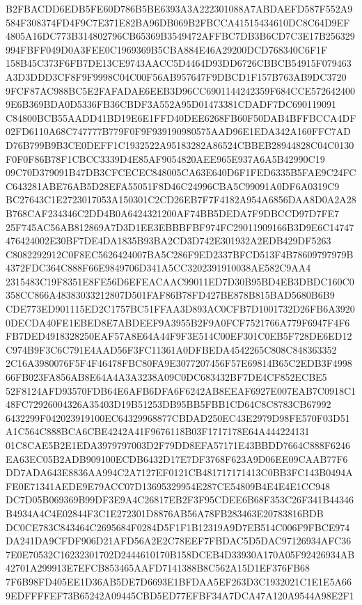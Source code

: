 \documentclass[UTF8,fontset=fandol,zihao=-4,a4paper]{ctexart}
\begin{document}
{{B2FBACDD6EDB5FE60D786B5BE6393A3A222301088A7ABDAEFD587F552A9584F308374FD4F9C7E371E82BA96DB069B2FBCCA41515434610DC8C64D9EF
4805A16DC773B314802796CB65369B3549472AFFBC7DB3B6CD7C3E17B256329994FBFF049D0A3FEE0C1969369B5CBA884E46A29200DCD768340C6F1F
158B45C373F6FB7DE13CE9743AACC5D4464D93DD6726CBBCB54915F079463A3D3DDD3CF8F9F9998C04C00F56AB957647F9DBCD1F157B763AB9DC3720
9FCF87AC988BC5E2FAFADAE6EEB3D96CC6901144242359F684CCE5726424009E6B369BDA0D5336FB36CBDF3A552A95D01473381CDADF7DC690119091
C84800BCB55AADD41BD19E6E1FFD40DEE6268FB60F50DAB4BFFBCCA4DF02FD6110A68C747777B779F0F9F939190980575AAD96E1EDA342A160FFC7AD
D76B799B9B3CE0DEFF1C1932522A95183282A86524CBBEB28944828C04C0130F0F0F86B78F1CBCC3339D4E85AF9054820AEE965E937A6A5B42990C19
09C70D379091B47DB3CFCECEC848005CA63E640D6F1FED6335B5FAE9C24FCC643281ABE76AB5D28EFA55051F8D46C24996CBA5C99091A0DF6A0319C9
BC27643C1E2723017053A150301C2CD26EB7F7F4182A954A6856DAA8D0A2A28B768CAF234346C2DD4B0A6424321200AF74BB5DEDA7F9DBCCD97D7FE7
25F745AC56AB812869A7D3D1EE3EBBBFBF974FC29011909166B3D9E6C14747476424002E30BF7DE4DA1835B93BA2CD3D742E301932A2EDB429DF5263
C8082292912C0F8EC5626424007BA5C286F9ED2337BFCD513F4B78609797979B4372FDC364C888F66E9849706D341A5CC3202391910038AE582C9AA4
2315483C19F8351E8FE56D6EFEACAAC99011ED7D30B95BD4EB3DBDC160C0358CC866A48383033212807D501FAF86B78FD427BE878B815BAD5680B6B9
CDE773ED901115ED2C1757BC51FFAA3D893AC0CFB7D1001732D26FB6A39200DECDA40FE1EBED8E7ABDEEF9A3955B2F9A0FCF7521766A779F6947F4F6
FB7DED4918328250EAF57A8E64A44F9F3E514C00EF301C0EB5F728DE6ED12C974B9F3C6C791E4AAD56F3FC11361A0DFBEDA4542265C808C848363352
2C16A3980076F5F4F46478FBC80FA9E3077207456F57E69814B65C2EDB3F499866FB023FA856AB8E64A4A3A3238A09C0DC683432BF7DE4CF852ECBE5
52F8124AFD93570FDB64E6AFB6DFA6F6242AB8EEAF6927E007EAB7C0918C148FC72926004326A35403D19B51253DB95BB5FBB1CD64C8C8783CB67992
6432299F042023919100EC64329968877CBDAD250EC43E2979D98FE570F03D51A1C564C888BCA6CBE4242A41F9676118B03F1717178E64A444224131
01C8CAE5B2E1EDA3979797003D2F79DD8EFA57171E43BBDD7664C888F6246EA63EC05B2ADB909100ECDB6432D17E7DF3768F623A9D06EE09CAAB77F6
DD7ADA643E8836AA994C2A7127EF0121CB481717171413C0BB3FC143B0494AFE0E71341AEDE9E79ACC07D13695329954E287CE54809B4E4E4E1CC948
DC7D05B069369B99DF3E9A4C26817EB2F3F95CDEE6B68F353C26F341B44346B4934A4C4E02844F3C1E272301D8876AB56A78FB283463E20783816BDB
DC0CE783C843464C2695684F0284D5F1F1B12319A9D7EB514C006F9FBCE974DA241DA9CFDF906D21AFD56A2E2C78EEF7FBDAC5D5DAC97126934AFC36
7E0E70532C16232301702D2444610170B158DCEB4D33930A170A05F92426934AB42701A299913E7EFCB853465AAFD7141388B8C562A15D1EF376FB68
7F6B98FD405EE1D36AB5DE7D6693E1BFDAA5EF263D3C1932021C1E1E5A669EDFFFFEF73B65242A09445CBD5ED77EFBF34A7DCA47A120A9544A98E2F1
}}
\end{document}

